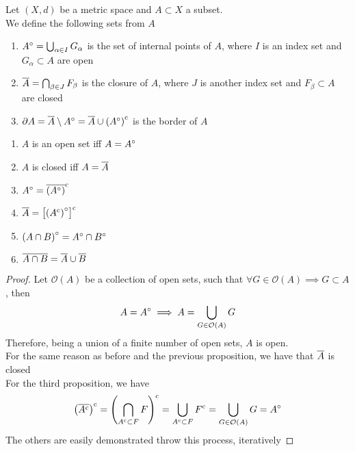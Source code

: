 \documentclass[../complete.tex]{subfiles}
\begin{document}
\begin{dfn}
	Let $(X,d)$ be a metric space and $A\subset X$ a subset.\\
	We define the following sets from $A$
	\begin{enumerate}
	\item $A^{\circ}=\bigcup_{\alpha\in I}G_\alpha$ is the set of internal points of $A$, where $I$ is an index set and $G_{\alpha}\subset A$ are open
	\item $\overline{A}=\bigcap_{\beta\in J}F_\beta$ is the closure of $A$, where $J$ is another index set and $F_\beta\subset A$ are closed
	\item $\partial{A}=\overline{A}\setminus A^{\circ}=\overline{A}\cup\left(A^{\circ}\right)^{\mathrm{c}}$ is the border of $A$
	\end{enumerate}
\end{dfn}
\begin{prop}
	\begin{enumerate}
	\item $A$ is an open set iff $A=A^{\circ}$
	\item $A$ is closed iff $A=\overline{A}$
	\item $A^{\circ}=\overline{\left( A^{\circ} \right)}^{\mathrm{c}}$
	\item $\overline{A}=\left[ \left( A^{\mathrm{c}} \right)^{\circ} \right]^{\mathrm{c}}$
	\item $\left( A\cap B \right)^{\circ}=A^{\circ}\cap B^{\circ}$
	\item $\overline{A\cap B}=\overline{A}\cup\overline{B}$
	\end{enumerate}
\end{prop}
\begin{proof}
	Let $\mathcal{O}(A)$ be a collection of open sets, such that $\forall{G}\in\mathcal{O}(A)\implies G\subset A$, then
	\begin{equation*}
		A=A^{\circ}\implies A=\bigcup_{G\in\mathcal{O}(A)}G
	\end{equation*}
	Therefore, being a union of a finite number of open sets, $A$ is open.\\
	For the same reason as before and the previous proposition, we have that $\overline{A}$ is closed\\
	For the third proposition, we have
	\begin{equation*}
		\left( \overline{A^{\mathrm{c}}} \right)^{\mathrm{c}}=\left( \bigcap_{A^{\mathrm{c}}\subset F}F \right)^{\mathrm{c}}=\bigcup_{A^{\mathrm{c}}\subset F}F^{\mathrm{c}}=\bigcup_{G\in\mathcal{O}(A)}G=A^{\circ}
	\end{equation*}
	The others are easily demonstrated throw this process, iteratively
\end{proof}
\end{document}
